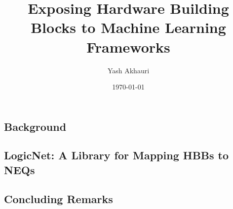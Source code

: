 \documentclass{dissertation}
\title{Exposing Hardware Building Blocks to Machine Learning Frameworks}
\author{Yash Akhauri}
\date{\today}
\begin{document}



\frontmatter{}




% 
\clearpage{}

\tableofcontents*{}
\listofalgorithms{}
\vspace{\baselineskip}

\listoffigures*{}
\vspace{\baselineskip}

\listoftables*{}
\clearpage{}

\cleardoublepage{}



\mainmatter{}
\begin{fullwidth}
\part{Background}
\end{fullwidth}
\cleardoublepage{}



\begin{fullwidth}
\part{LogicNet: A Library for Mapping HBBs to NEQs}
\end{fullwidth}

% 



\begin{fullwidth}
\part{Concluding Remarks}
\end{fullwidth}

\end{document}
